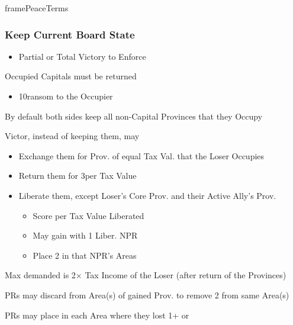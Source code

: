 \documentclass[10pt]{article}
\newlength{\fhPeaceTerms} \setlength\fhPeaceTerms{45.5\baselineskip}
\begin{document}
\begin{dynamiccontents*}{framePeaceTerms}
\begin{eubox}{\fhPeaceTerms}
\begin{multicols}{3}
		\subsubsection*{Keep Current Board State}
		\begin{itemize}
			{
				\color{peaceReqColor}
				\item {}
				\begin{itemize}
					\item Partial or Total Victory to Enforce
				\end{itemize}
			}
			\item Occupied Capitals must be returned
			\begin{itemize}
				\item 10\ducats ransom to the Occupier
			\end{itemize}
			\item By default both sides keep all non-Capital Provinces that they Occupy
			\item Victor, instead of keeping them, may
			\begin{itemize}
				\item Exchange them for Prov. of equal Tax Val. that the Loser Occupies
				\item Return them for 3\ducats per Tax Value
				\item Liberate them, except Loser's Core Prov. and their Active Ally's Prov.
				\begin{itemize}
					\item Score  per Tax Value Liberated
					\item May gain \alliance with 1 Liber. NPR
					\item Place 2 \influence in that NPR's Areas
				\end{itemize}
			\end{itemize}
			\item Max \ducats demanded is 2× Tax Income of the Loser (after return of the Provinces)
			\item PRs may discard \claim from Area(s) of gained Prov. to remove 2 \unrest from same Area(s)
			\item PRs may place \claim in each Area where they lost 1+ \town or \vassal
		\end{itemize}


\end{multicols}
\end{eubox}
\end{dynamiccontents*}
\end{document}
